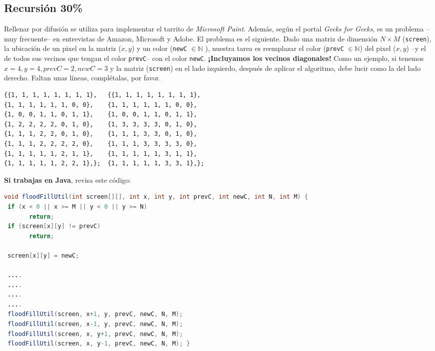 \documentclass[10 pt]{article}
\begin{document}
\begin{multicols}{2}
\section{Recursión 30\%}
Rellenar por difusión se utiliza para implementar el tarrito de \textit{Microsoft Paint}. Además, según el portal \textit{Geeks for Geeks}, es un problema --muy frecuente-- en 
entrevistas de Amazon, Microsoft y  Adobe. El problema es el siguiente. Dado una matriz de dimensión $N\times M$ (\texttt{screen}), la ubicación de un pixel en la matriz ($x,y$) y un color (\texttt{newC} $\in \mathbb{N}$ ),
nuestra tarea es reemplazar el color (\texttt{prevC} $\in \mathbb{N}$) del pixel ($x,y$) --y el de todos sus vecinos que tengan el color \texttt{prevC}-- con el color \texttt{newC}. \textbf{¡Incluyamos los vecinos diagonales!}   
Como un ejemplo, si tenemos $x=4, y=4, prevC=2, newC=3$ y la matriz (\texttt{screen}) en el lado izquierdo, después de aplicar el algoritmo, debe lucir como la del lado derecho. Faltan unas líneas, complétalas, por favor.

{\footnotesize
\begin{center}
\begin{verbatim}
{{1, 1, 1, 1, 1, 1, 1, 1},   {{1, 1, 1, 1, 1, 1, 1, 1},
{1, 1, 1, 1, 1, 1, 0, 0},    {1, 1, 1, 1, 1, 1, 0, 0},
{1, 0, 0, 1, 1, 0, 1, 1},    {1, 0, 0, 1, 1, 0, 1, 1}, 
{1, 2, 2, 2, 2, 0, 1, 0},    {1, 3, 3, 3, 3, 0, 1, 0},
{1, 1, 1, 2, 2, 0, 1, 0},    {1, 1, 1, 3, 3, 0, 1, 0},
{1, 1, 1, 2, 2, 2, 2, 0},    {1, 1, 1, 3, 3, 3, 3, 0},
{1, 1, 1, 1, 1, 2, 1, 1},    {1, 1, 1, 1, 1, 3, 1, 1},
{1, 1, 1, 1, 1, 2, 2, 1},};  {1, 1, 1, 1, 1, 3, 3, 1},};

\end{verbatim}
\end{center}
} 


\newpage
\textbf{Si trabajas en Java}, revisa este código:

{\footnotesize
\begin{lstlisting}[language=Java]
void floodFillUtil(int screen[][], int x, int y, int prevC, int newC, int N, int M) { 
 if (x < 0 || x >= M || y < 0 || y >= N) 
       return; 
 if (screen[x][y] != prevC) 
       return; 
  
 screen[x][y] = newC; 
 
 ....
 ....
 ....
 ....
 floodFillUtil(screen, x+1, y, prevC, newC, N, M); 
 floodFillUtil(screen, x-1, y, prevC, newC, N, M); 
 floodFillUtil(screen, x, y+1, prevC, newC, N, M); 
 floodFillUtil(screen, x, y-1, prevC, newC, N, M); } 


\end{lstlisting}}
\end{multicols}
\end{document}
